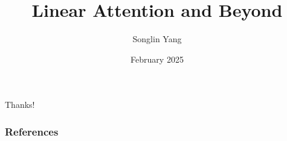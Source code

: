 \documentclass{beamer}
\title{Linear Attention and Beyond}
\author{Songlin Yang}
\institute{MIT CSAIL}
\date{February 2025}
\begin{document}






\begin{frame}{}
\begin{center}
\LARGE Thanks!
\end{center}
\end{frame}
\begin{frame}[allowframebreaks]
        \frametitle{References}
        \printbibliography
\end{frame}
\end{document}
